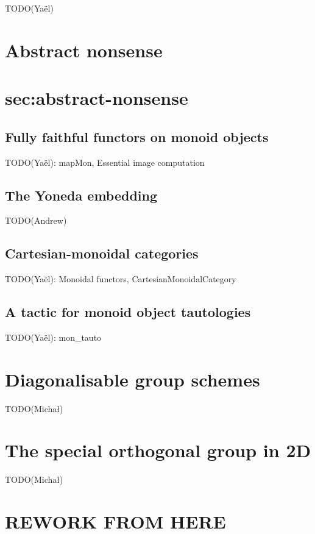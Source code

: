 \documentclass{article}
\begin{document}
TODO(Yaël)



\section{Abstract nonsense}\section{sec:abstract-nonsense}


\subsection{Fully faithful functors on monoid objects}


TODO(Yaël): mapMon, Essential image computation


\subsection{The Yoneda embedding}


TODO(Andrew)


\subsection{Cartesian-monoidal categories}


TODO(Yaël): Monoidal functors, CartesianMonoidalCategory


\subsection{A tactic for monoid object tautologies}


TODO(Yaël): mon_tauto


\section{Diagonalisable group schemes}


TODO(Michał)


\section{The special orthogonal group in 2D}


TODO(Michał)



\section{REWORK FROM HERE}
\end{document}
